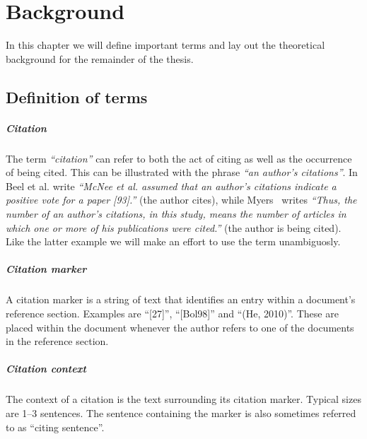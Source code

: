 \chapter{Background}\label{chap:background}
In this chapter we will define important terms and lay out the theoretical background for the remainder of the thesis.

\section{Definition of terms}
\paragraph{Citation} The term \emph{``citation''} can refer to both the act of citing as well as the occurrence of being cited. This can be illustrated with the phrase \emph{``an author's citations''}. In \cite{Beel2016} Beel et al. write \emph{``McNee et al. assumed that an author's citations indicate a positive vote for a paper [93].''} (the author cites), while Myers~\cite{Myers1970} writes \emph{``Thus, the number of an author's citations, in this study, means the number of articles in which one or more of his publications were cited.''} (the author is being cited). Like the latter example we will make an effort to use the term unambiguosly.
\paragraph{Citation marker} A citation marker is a string of text that identifies an entry within a document's reference section. Examples are ``[27]'', ``[Bol98]'' and ``(He, 2010)''. These are placed within the document whenever the author refers to one of the documents in the reference section.
\paragraph{Citation context} The context of a citation is the text surrounding its citation marker. Typical sizes are 1--3 sentences. The sentence containing the marker is also sometimes referred to as ``citing sentence''. 

